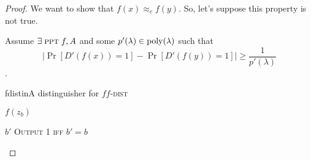 \begin{proof}
    We want to show that $f(x) \approx_{c} f(y)$. So, let's suppose this property is not true.

    Assume $\exists\; \textsc{ppt}\; f, A$ and some $p'(\lambda) \in \mathrm{poly}(\lambda) $ such that
    \begin{equation}
        \left| \Pr[D'(f(x)) = 1] - \Pr[D'(f(y)) = 1] \right| \geq \frac{1}{p'(\lambda)}
    \end{equation}.

    \begin{cryptogame}{fdistin}{A distinguisher for $f$}{$f$-\textsc{dist}}

        {$f(z_b)$}
        {}

        \postlevel

        \send{}
        {$b'$}
        {\textsc{Output 1 iff} $b' = b$}

    \end{cryptogame}

    \begin{figure}
        \centering
        \sdinit{}
\end{figure}
\end{proof}
